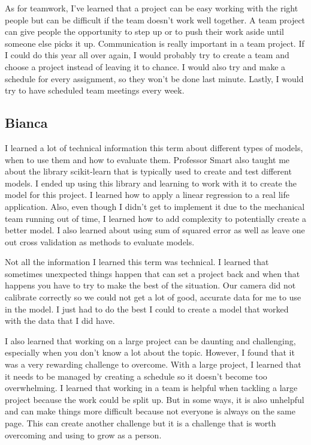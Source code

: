 \documentclass[onecolumn, draftclsnofoot,10pt, compsoc]{IEEEtran}
\begin{document}
	As for teamwork, I've learned that a project can be easy working with the right people but can be difficult if the team doesn't work well together.  A team project can give people the opportunity to step up or to push their work aside until someone else picks it up. Communication is really important in a team project. If I could do this year all over again, I would probably try to create a team and choose a project instead of leaving it to chance. I would also try and make a schedule for every assignment, so they won't be done last minute. Lastly, I would try to have scheduled team meetings every week.
	
	
	\subsection{Bianca}
	
	I learned a lot of technical information this term about different types of models, when to use them and how to evaluate them. Professor Smart also taught me about the library scikit-learn that is typically used to create and test different models. I ended up using this library and learning to work with it to create the model for this project. I learned how to apply a linear regression to a real life application. Also, even though I didn't get to implement it due to the mechanical team running out of time, I learned how to add complexity to potentially create a better model. I also learned about using sum of squared error as well as leave one out cross validation as methods to evaluate models. 
	
	Not all the information I learned this term was technical. I learned that sometimes unexpected things happen that can set a project back and when that happens you have to try to make the best of the situation. Our camera did not calibrate correctly so we could not get a lot of good, accurate data for me to use in the model. I just had to do the best I could to create a model that worked with the data that I did have.
	
	I also learned that working on a large project can be daunting and challenging, especially when you don't know a lot about the topic. However, I found that it was a very rewarding challenge to overcome. With a large project, I learned that it needs to be managed by creating a schedule so it doesn't become too overwhelming. I learned that working in a team is helpful when tackling a large project because the work could be split up. But in some ways, it is also unhelpful and can make things more difficult because not everyone is always on the same page. This can create another challenge but it is a challenge that is worth overcoming and using to grow as a person. 
	
\end{document}
